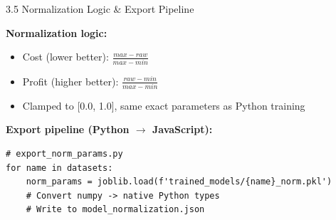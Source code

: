 \documentclass[aspectratio=169]{beamer}
\begin{document}
\begin{frame}{3.5 Normalization Logic \& Export Pipeline}

  \textbf{Normalization logic:}
  \begin{itemize}
    \item \alert{Cost} (lower better): $\frac{max - raw}{max - min}$
    \item \alert{Profit} (higher better): $\frac{raw - min}{max - min}$
    \item Clamped to [0.0, 1.0], same exact parameters as Python training
  \end{itemize}

  \vspace{0.2cm}
  \textbf{Export pipeline (Python $\rightarrow$ JavaScript):}
  \begin{lstlisting}[style=pythonstyle,basicstyle=\ttfamily\footnotesize]
# export_norm_params.py
for name in datasets:
    norm_params = joblib.load(f'trained_models/{name}_norm.pkl')
    # Convert numpy -> native Python types
    # Write to model_normalization.json
    \end{lstlisting}
\end{frame}
\end{document}
